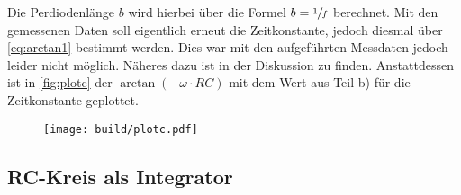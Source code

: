 Die Perdiodenlänge $b$ wird hierbei über die Formel $b=\sfrac{1}{f}$ berechnet. Mit den gemessenen Daten soll 
eigentlich erneut die Zeitkonstante, jedoch diesmal über \autoref{eq:arctan1} bestimmt werden. Dies war mit 
den aufgeführten Messdaten jedoch leider nicht möglich. Näheres dazu ist in der Diskussion zu finden. 
Anstattdessen ist in \autoref{fig:plotc} der $\arctan(-\omega\cdot RC)$ mit dem Wert aus Teil b) für die 
Zeitkonstante geplottet.
\begin{figure}[H]
    \centering
    \texttt{[image: build/plotc.pdf]}
\end{figure}
\subsection{RC-Kreis als Integrator}
         
         
        
         
         
         
         
         
                 
         
         
         
        